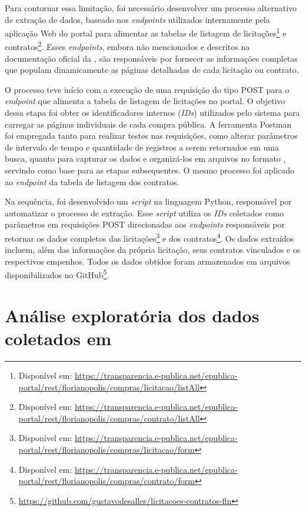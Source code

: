 \documentclass[
	12pt,				%
	oneside,			%
	a4paper,			%
	chapter=TITLE,		%
	section=TITLE,		%
	english,			%
	brazil				%
	]{abntex2}
\begin{document}
Para contornar essa limitação, foi necessário desenvolver um processo alternativo de extração de dados, baseado nos \textit{endpoints} utilizados internamente pela aplicação Web do portal para alimentar as tabelas de listagem de licitações\footnote{Disponível em: \url{https://transparencia.e-publica.net/epublica-portal/rest/florianopolis/compras/licitacao/listAll}} e contratos\footnote{Disponível em: \url{https://transparencia.e-publica.net/epublica-portal/rest/florianopolis/compras/contrato/listAll}}. Esses \textit{endpoints}, embora não mencionados e descritos na documentação oficial da , são responsáveis por fornecer as informações completas que populam dinamicamente as páginas detalhadas de cada licitação ou contrato.

O processo teve início com a execução de uma requisição  do tipo POST para o \textit{endpoint} que alimenta a tabela de listagem de licitações no portal. O objetivo dessa etapa foi obter os identificadores internos (\textit{IDs}) utilizados pelo sistema para carregar as páginas individuais de cada compra pública. A ferramenta Postman foi empregada tanto para realizar testes nas requisições, como alterar parâmetros de intervalo de tempo e quantidade de registros a serem retornados em uma busca, quanto para capturar os dados e organizá-los em arquivos no formato , servindo como base para as etapas subsequentes. O mesmo processo foi aplicado ao \textit{endpoint} da tabela de listagem dos contratos.

Na sequência, foi desenvolvido um \textit{script} na linguagem Python, responsável por automatizar o processo de extração. Esse \textit{script} utiliza os \textit{IDs} coletados como parâmetros em requisições POST direcionadas aos \textit{endpoints} responsáveis por retornar os dados completos das licitações\footnote{Disponível em: \url{https://transparencia.e-publica.net/epublica-portal/rest/florianopolis/compras/licitacao/form}} e dos contratos\footnote{Disponível em: \url{https://transparencia.e-publica.net/epublica-portal/rest/florianopolis/compras/contrato/form}}. Os dados extraídos incluem, além das informações da própria licitação, seus contratos vinculados e os respectivos empenhos. Todos os dados obtidos foram armazenados em arquivos  disponibilizados no GitHub\footnote{\url{https://github.com/gustavodesalles/licitacoes-contratos-fln}}.

\section{Análise exploratória dos dados coletados em }
\end{document}

